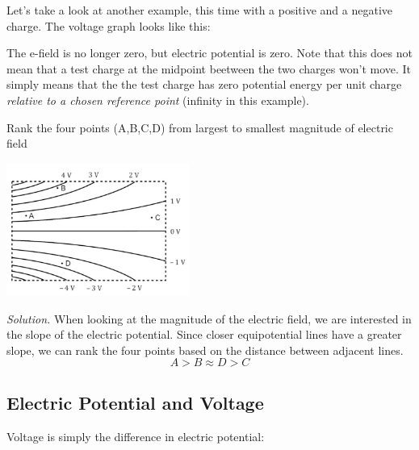 \documentclass[12pt, titlepage]{article}
\begin{document}
\newpage 

Let's take a look at another example, this time with a positive and a negative charge. The voltage graph looks like this:

\begin{center}
\end{center}

The e-field is no longer zero, but electric potential is zero. Note that this does not mean that a test charge at the midpoint beetween the two charges won't move. It simply means that the the test charge has zero potential energy per unit charge \textit{relative to a chosen reference point} (infinity in this example).

\begin{Problem}
    Rank the four points (A,B,C,D) from largest to smallest magnitude of electric field 
    \begin{center}
        \includegraphics[width=6cm]{Example.png}
    \end{center}

    \tcblower

    \textit{Solution.} When looking at the magnitude of the electric field, we are interested in the slope of the electric potential. Since closer equipotential lines have a greater slope, we can rank the four points based on the distance between adjacent lines. 
    \[A > B \approx D > C\]
\end{Problem}

\subsection*{Electric Potential and Voltage}

Voltage is simply the difference in electric potential:
\end{document}
